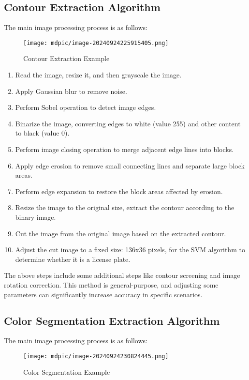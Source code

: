 \documentclass{article}
\begin{document}
	\subsection{Contour Extraction Algorithm}
	The main image processing process is as follows:
	\begin{figure}[H]
		\centering
		\texttt{[image: mdpic/image-20240924225915405.png]}
		\caption{Contour Extraction Example}
	\end{figure}
	
	\begin{enumerate}
		\item Read the image, resize it, and then grayscale the image.
		\item Apply Gaussian blur to remove noise.
		\item Perform Sobel operation to detect image edges.
		\item Binarize the image, converting edges to white (value 255) and other content to black (value 0).
		\item Perform image closing operation to merge adjacent edge lines into blocks.
		\item Apply edge erosion to remove small connecting lines and separate large block areas.
		\item Perform edge expansion to restore the block areas affected by erosion.
		\item Resize the image to the original size, extract the contour according to the binary image.
		\item Cut the image from the original image based on the extracted contour.
		\item Adjust the cut image to a fixed size: 136x36 pixels, for the SVM algorithm to determine whether it is a license plate.
	\end{enumerate}
	
	The above steps include some additional steps like contour screening and image rotation correction. This method is general-purpose, and adjusting some parameters can significantly increase accuracy in specific scenarios.
	
	\subsection{Color Segmentation Extraction Algorithm}
	The main image processing process is as follows:
	
	\begin{figure}[H]
		\centering
		\texttt{[image: mdpic/image-20240924230824445.png]}
		\caption{Color Segmentation Example}
	\end{figure}
	
\end{document}
